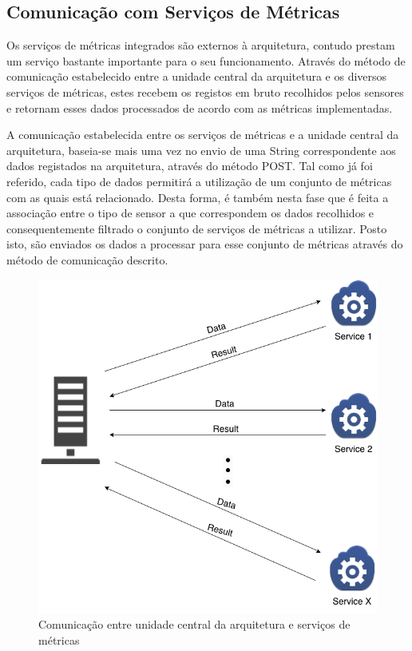 \begin{center}
\end{center}

\subsection{Comunicação com Serviços de Métricas}

Os serviços de métricas integrados são externos à arquitetura, contudo prestam um serviço bastante importante para o seu funcionamento. Através do método de comunicação estabelecido entre a unidade central da arquitetura e os diversos serviços de métricas, estes recebem os registos em bruto recolhidos pelos sensores e retornam esses dados processados de acordo com as métricas implementadas.

A comunicação estabelecida entre os serviços de métricas e a unidade central da arquitetura, baseia-se mais uma vez no envio de uma String correspondente aos dados registados na arquitetura, através do método POST. Tal como já foi referido, cada tipo de dados permitirá a utilização de um conjunto de métricas com as quais está relacionado. Desta forma, é também nesta fase que é feita a associação entre o tipo de sensor a que correspondem os dados recolhidos e consequentemente filtrado o conjunto de serviços de métricas a utilizar. Posto isto, são enviados os dados a processar para esse conjunto de métricas através do método de  comunicação descrito.

\begin{figure}[htb]
   \centering
   \includegraphics[scale=0.38]{Images/metricsdiagram1.png}
   \caption{Comunicação entre unidade central da arquitetura e serviços de métricas}
\end{figure}

